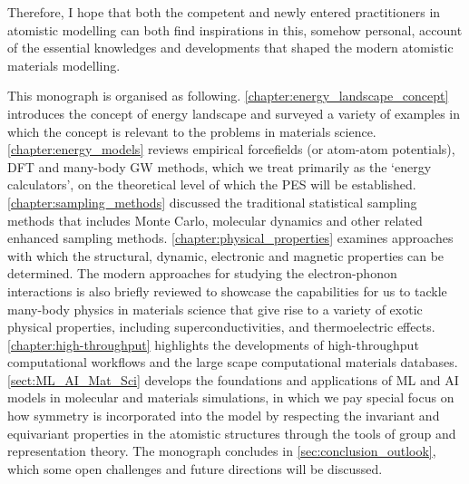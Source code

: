 Therefore, I hope that both the competent and newly entered practitioners in atomistic modelling can both find inspirations in this, somehow personal, account of the essential knowledges and developments that shaped the modern atomistic materials modelling.

This monograph is organised as following. \cref{chapter:energy_landscape_concept} introduces the concept of energy landscape and surveyed a variety of examples in which the concept is relevant to the problems in materials science. 
\cref{chapter:energy_models} reviews empirical forcefields (or atom-atom potentials), DFT and many-body GW methods, which we treat primarily as the `energy calculators', on the theoretical level of which the PES will be established.  
\cref{chapter:sampling_methods} discussed the traditional statistical sampling methods that includes Monte Carlo, molecular dynamics and other related enhanced sampling methods.  
\cref{chapter:physical_properties} examines approaches with which the structural, dynamic, electronic and magnetic properties can be determined. The modern approaches for studying the electron-phonon interactions is also briefly reviewed to showcase the capabilities for us to tackle many-body physics in materials science that give rise to a variety of exotic physical properties, including superconductivities, and thermoelectric effects. 
\cref{chapter:high-throughput} highlights the developments of high-throughput computational workflows and the large scape computational materials databases. 
\cref{sect:ML_AI_Mat_Sci} develops the foundations and applications of ML and AI models in molecular and materials simulations, in which we pay special focus on how symmetry is incorporated into the model by respecting the invariant and equivariant properties in the atomistic structures through the tools of group and representation theory.
The monograph concludes in \cref{sec:conclusion_outlook}, which some open challenges and future directions will be discussed.
